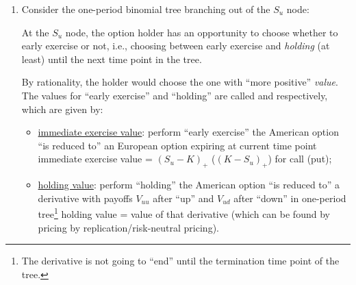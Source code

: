 \begin{enumerate}
\item \label{it:amer-option-rational}
Consider the one-period binomial tree branching out of the \(S_u\) node:
\begin{center}
\end{center}

At the \(S_u\) node, the option holder has an opportunity to choose whether to
early exercise or not, i.e., choosing between early exercise and \emph{holding}
 (at least) until the next time point in the tree.

By rationality, the holder would choose the one with ``more positive''
\emph{value}. The values for ``early exercise''
and ``holding'' are called  and  respectively, which are given by:

\begin{itemize}
\item \underline{immediate exercise value}: perform ``early exercise''
 the American option ``is reduced to'' an European option
expiring at current time point  immediate exercise value =
\((S_u-K)_{+}\) (\((K-S_u)_{+}\)) for call (put);

\item \underline{holding value}: perform ``holding''  the
American option ``is reduced to'' a derivative with payoffs \(V_{uu}\) after
``up'' and \(V_{ud}\) after ``down'' in one-period tree\footnote{The derivative
is not going to ``end'' until the termination time point of the tree.}
 holding value = value of that derivative  (which can be
found by pricing by replication/risk-neutral pricing).
\end{itemize}


\end{enumerate}

